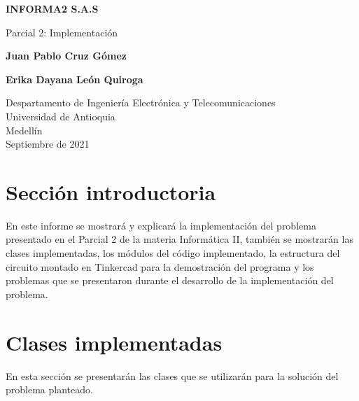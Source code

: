 \documentclass{article}
\begin{document}
\begin{titlepage}
    \begin{center}
        \vspace*{1cm}
            
        \Huge
        \textbf{INFORMA2 S.A.S}
            
        \vspace{0.5cm}
        \LARGE
        Parcial 2: Implementación
            
        \vspace{5cm}
            
        \textbf{Juan Pablo Cruz Gómez}
        
        \vspace{0.5cm}
        
        \textbf{Erika Dayana León Quiroga}
            
        \vfill
            
        \vspace{0.8cm}
            
        \Large
        Despartamento de Ingeniería Electrónica y Telecomunicaciones\\
        Universidad de Antioquia\\
        Medellín\\
        Septiembre de 2021
            
    \end{center}
\end{titlepage}

\tableofcontents
\newpage
\section{Sección introductoria}\label{intro}
En este informe se mostrará y explicará la implementación del problema presentado en el Parcial 2 de la materia Informática II, también se mostrarán las clases implementadas, los módulos del código implementado, la estructura del circuito montado en Tinkercad para la demostración del programa y los problemas que se presentaron durante el desarrollo de la implementación del problema.

\section{Clases implementadas} \label{clases}
En esta sección se presentarán las clases que se utilizarán para la solución del problema planteado.
\end{document}
